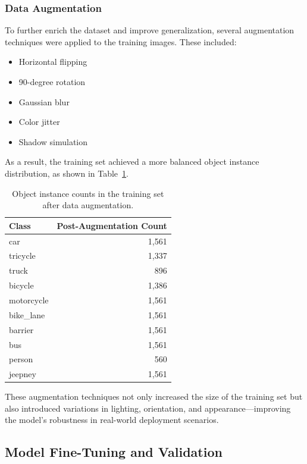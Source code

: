 \subsubsection{Data Augmentation}

To further enrich the dataset and improve generalization, several augmentation techniques were applied to the training images. These included:

\begin{itemize}
    \item Horizontal flipping
    \item 90-degree rotation
    \item Gaussian blur
    \item Color jitter
    \item Shadow simulation
\end{itemize}

As a result, the training set achieved a more balanced object instance distribution, as shown in Table~\ref{tab:augmented_class_counts}.

\begin{table}[h]
\centering
\begin{tabular}{l r}
\toprule
\textbf{Class} & \textbf{Post-Augmentation Count} \\
\midrule
car & 1,561 \\
tricycle & 1,337 \\
truck & 896 \\
bicycle & 1,386 \\
motorcycle & 1,561 \\
bike\_lane & 1,561 \\
barrier & 1,561 \\
bus & 1,561 \\
person & 560 \\
jeepney & 1,561 \\
\bottomrule
\end{tabular}
\caption{Object instance counts in the training set after data augmentation.}
\label{tab:augmented_class_counts}
\end{table}

These augmentation techniques not only increased the size of the training set but also introduced variations in lighting, orientation, and appearance—improving the model's robustness in real-world deployment scenarios.

\subsection{Model Fine-Tuning and Validation}

